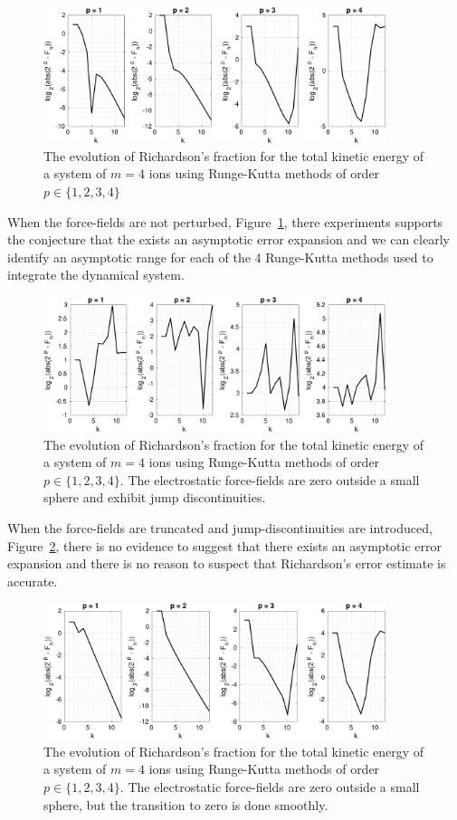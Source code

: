 \documentclass[runningheads]{llncs}
\begin{document}
\begin{figure}
  \centering
  \includegraphics[width=10cm]{iontrap_mwe1.pdf}
  \caption{The evolution of Richardson's fraction for the total kinetic energy of a system of $m=4$ ions using Runge-Kutta methods of order $p \in \{1,2,3,4\}$}
  \label{fig:iontrap_mwe1}
\end{figure}

When the force-fields are not perturbed, Figure~\ref{fig:iontrap_mwe1}, there experiments supports the conjecture that the exists an asymptotic error expansion and we can clearly identify an asymptotic range for each of the 4 Runge-Kutta methods used to integrate the dynamical system. 

\begin{figure}
  \centering
  \includegraphics[width=10cm]{iontrap_mwe2.pdf}
  \caption{The evolution of Richardson's fraction for the total kinetic energy of a system of $m=4$ ions using Runge-Kutta methods of order $p \in \{1,2,3,4\}$. The electrostatic force-fields are zero outside a small sphere and exhibit jump discontinuities.}
  \label{fig:iontrap_mwe2}
\end{figure}

When the force-fields are truncated and jump-discontinuities are introduced, Figure~\ref{fig:iontrap_mwe2}, there is no evidence to suggest that there exists an asymptotic error expansion and there is no reason to suspect that Richardson's error estimate is accurate.

\begin{figure}
  \centering
  \includegraphics[width=10cm]{iontrap_mwe4.pdf}
  \caption{The evolution of Richardson's fraction for the total kinetic energy of a system of $m=4$ ions using Runge-Kutta methods of order $p \in \{1,2,3,4\}$. The electrostatic force-fields are zero outside a small sphere, but the transition to zero is done smoothly.}
  \label{fig:iontrap_mwe4}
\end{figure}
\end{document}
